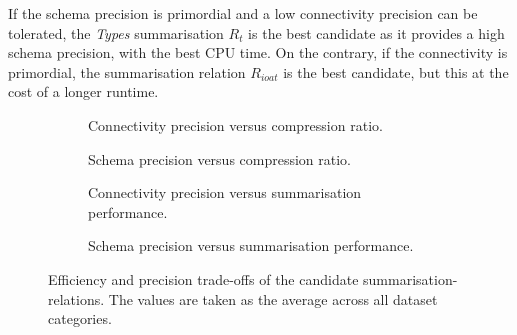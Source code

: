 If the schema precision is primordial and a low connectivity precision can be tolerated, the \emph{Types} summarisation $R_t$ is the best candidate as it provides a high schema precision, with the best CPU time. On the contrary, if the connectivity is primordial, the summarisation relation $R_{ioat}$ is the best candidate, but this at the cost of a longer runtime.

\begin{figure}
	\centering
	\begin{subfigure}[t]{0.46\textwidth}
		\resizebox{\textwidth}{!}{
			
		}
		\caption{Connectivity precision versus compression ratio.}
		\label{fig:trade-conn-volume}
	\end{subfigure}
	\qquad
	\begin{subfigure}[t]{0.46\textwidth}
		\resizebox{\textwidth}{!}{
			
		}
		\caption{Schema precision versus compression ratio.}
		\label{fig:trade-schema-volume}
	\end{subfigure}
	\qquad%
	\begin{subfigure}[t]{0.46\textwidth}
		\resizebox{\textwidth}{!}{
			
		}
		\caption{Connectivity precision versus summarisation performance.}
		\label{fig:trade-conn-cpu}
	\end{subfigure}
	\qquad%
	\begin{subfigure}[t]{0.46\textwidth}
		\resizebox{\textwidth}{!}{
			
		}
		\caption{Schema precision versus summarisation performance.}
		\label{fig:trade-schema-cpu}
	\end{subfigure}
	\caption{Efficiency and precision trade-offs of the candidate \glspl{summarisation-relation}. The values are taken as the average across all dataset categories.}
\end{figure}
